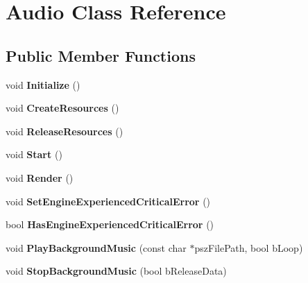 \hypertarget{classAudio}{}\section{Audio Class Reference}
\label{classAudio}
\subsection*{Public Member Functions}
\begin{DoxyCompactItemize}
\item 
\mbox{\label{classAudio_a8d7f6a57c5c356d8d7f081131f6847ed}} 
void {\bfseries Initialize} ()
\item 
\mbox{\label{classAudio_a11058ecdf78a58033843d782aa5a9044}} 
void {\bfseries Create\+Resources} ()
\item 
\mbox{\label{classAudio_a607dfc560f2d305c82155573c55833d3}} 
void {\bfseries Release\+Resources} ()
\item 
\mbox{\label{classAudio_a545c9a12f31bc6964ac90bbf2358ada2}} 
void {\bfseries Start} ()
\item 
\mbox{\label{classAudio_a1a75c88400cddd2637f20f92ab0d7ec7}} 
void {\bfseries Render} ()
\item 
\mbox{\label{classAudio_a57349dc20c951ef8ae62694f2c9ba8a6}} 
void {\bfseries Set\+Engine\+Experienced\+Critical\+Error} ()
\item 
\mbox{\label{classAudio_a3452e0b9a18248b22d8a1af865eb213f}} 
bool {\bfseries Has\+Engine\+Experienced\+Critical\+Error} ()
\item 
\mbox{\label{classAudio_a73bed78da7257f6eef05c5c64f0b98e9}} 
void {\bfseries Play\+Background\+Music} (const char $\ast$psz\+File\+Path, bool b\+Loop)
\item 
\mbox{\label{classAudio_a2dfee6643fd471e002d9e68b4da3097d}} 
void {\bfseries Stop\+Background\+Music} (bool b\+Release\+Data)
\item 
\mbox{\label{classAudio_a4a27951873f87a8417ae384171a4a6d6}} 

\end{DoxyCompactItemize}
